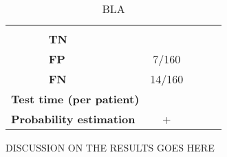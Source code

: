\begin{table}[]
\begin{center}
\begin{tabular}{|l|l|c|c|c|c|}
		&                                   &                         
		                    &                                   
		&                                    \\ \cline{2-6} 
		& \textbf{TN} &                                   
		&                                             &               
		                    &                                    \\ 
		\cline{2-6} 
		& \textbf{FP} & 7/160                             
		&                                             &               
		                    &                                    \\ 
		\cline{2-6} 
		& \textbf{FN} & 14/160                            
		&                                             &               
		                    &                                    \\ 
		\hline
		\multicolumn{2}{|l|}{\textbf{Test time (per 
		patient)}}                                    &               
		                    
		&                                             &               
		                    &                                    \\ 
		\hline
		\multicolumn{2}{|l|}{\textbf{Probability 
		estimation}}                                     & 
		+                                 &                           
		                  &                                   
		&                                    \\ \hline
	\end{tabular}
\end{center}
\caption{BLA}
\label{tbl:res}
\end{table}

DISCUSSION ON THE RESULTS GOES HERE